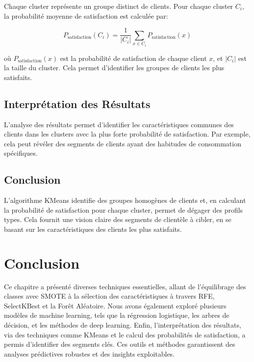 Chaque cluster représente un groupe distinct de clients. Pour chaque cluster \( C_i \), la probabilité moyenne de satisfaction est calculée par:

\[
P_{\text{satisfaction}}(C_i) = \frac{1}{|C_i|} \sum_{x \in C_i} P_{\text{satisfaction}}(x)
\]

où \( P_{\text{satisfaction}}(x) \) est la probabilité de satisfaction de chaque client \( x \), et \( |C_i| \) est la taille du cluster. Cela permet d'identifier les groupes de clients les plus satisfaits.

\subsection{Interprétation des Résultats}

L'analyse des résultats permet d'identifier les caractéristiques communes des clients dans les clusters avec la plus forte probabilité de satisfaction. Par exemple, cela peut révéler des segments de clients ayant des habitudes de consommation spécifiques.

\subsection{Conclusion}

L'algorithme KMeans identifie des groupes homogènes de clients et, en calculant la probabilité de satisfaction pour chaque cluster, permet de dégager des profils types. Cela fournit une vision claire des segments de clientèle à cibler, en se basant sur les caractéristiques des clients les plus satisfaits.

\section{Conclusion}

Ce chapitre a présenté diverses techniques essentielles, allant de l'équilibrage des classes avec SMOTE à la sélection des caractéristiques à travers RFE, SelectKBest et la Forêt Aléatoire. Nous avons également exploré plusieurs modèles de machine learning, tels que la régression logistique, les arbres de décision, et les méthodes de deep learning. Enfin, l'interprétation des résultats, via des techniques comme KMeans et le calcul des probabilités de satisfaction, a permis d'identifier des segments clés. Ces outils et méthodes garantissent des analyses prédictives robustes et des insights exploitables.
